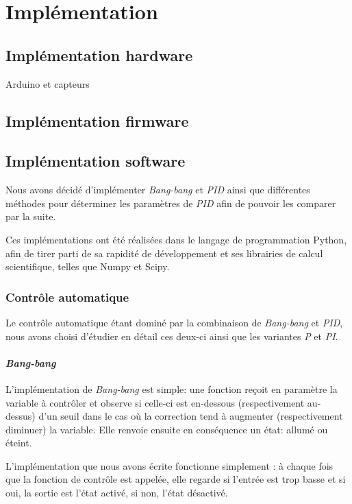 \documentclass[a4paper,10pt]{report}
\begin{document}
\chapter{Implémentation}
\label{chap:impl}


\section{Implémentation hardware}

Arduino et capteurs

\section{Implémentation firmware}

\section{Implémentation software}

Nous avons décidé d'implémenter \textit{Bang-bang} et \textit{PID} ainsi que différentes méthodes pour déterminer les paramètres de \textit{PID} afin de pouvoir les comparer par la suite.

Ces implémentations ont été réalisées dans le langage de programmation Python, afin de tirer parti de sa rapidité de développement et ses librairies de calcul scientifique, telles que Numpy et Scipy.

\subsection{Contrôle automatique}
\label{sec:contr-implem}
Le contrôle automatique étant dominé par la combinaison de \textit{Bang-bang} et \textit{PID}, nous avons choisi d'étudier en détail ces deux-ci ainsi que les variantes \textit{P} et \textit{PI}.

\subsubsection{\emph{Bang-bang}}

L'implémentation de \emph{Bang-bang} est simple: une fonction reçoit en paramètre la variable à contrôler et observe si celle-ci est en-dessous (respectivement au-dessus) d'un seuil dans le cas où la correction tend à augmenter (respectivement diminuer) la variable. Elle renvoie ensuite en conséquence un état: allumé ou éteint.

L'implémentation que nous avons écrite fonctionne simplement : à chaque fois que la fonction de contrôle est appelée, elle regarde si l'entrée est trop basse et si oui, la sortie est l'état activé, si non, l'état désactivé.
\end{document}
